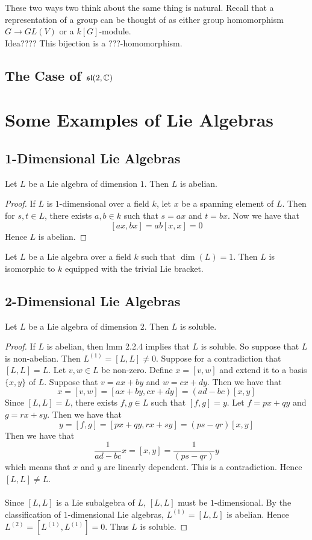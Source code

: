 \documentclass[a4paper]{article}
\begin{document}
These two ways two think about the same thing is natural. Recall that a representation of a group can be thought of as either group homomorphism $G\to GL(V)$ or a $k[G]$-module. \\

Idea???? This bijection is a ???-homomorphism. 

\subsection{The Case of $\mathfrak{sl}(2,\mathbb{C})$}

\pagebreak
\section{Some Examples of Lie Algebras}
\subsection{1-Dimensional Lie Algebras}
\begin{prp}{}{} Let $L$ be a Lie algebra of dimension $1$. Then $L$ is abelian. \tcbline
\begin{proof}
If $L$ is $1$-dimensional over a field $k$, let $x$ be a spanning element of $L$. Then for $s,t\in L$, there exists $a,b\in k$ such that $s=ax$ and $t=bx$. Now we have that $$[ax,bx]=ab[x,x]=0$$ Hence $L$ is abelian. 
\end{proof}
\end{prp}

\begin{prp}{}{} Let $L$ be a Lie algebra over a field $k$ such that $\dim(L)=1$. Then $L$ is isomorphic to $k$ equipped with the trivial Lie bracket. 
\end{prp}

\subsection{2-Dimensional Lie Algebras}
\begin{prp}{}{} Let $L$ be a Lie algebra of dimension $2$. Then $L$ is soluble. \tcbline
\begin{proof}
If $L$ is abelian, then lmm 2.2.4 implies that $L$ is soluble. So suppose that $L$ is non-abelian. Then $L^{(1)}=[L,L]\neq 0$. Suppose for a contradiction that $[L,L]=L$. Let $v,w\in L$ be non-zero. Define $x=[v,w]$ and extend it to a basis $\{x,y\}$ of $L$. Suppose that $v=ax+by$ and $w=cx+dy$. Then we have that $$x=[v,w]=[ax+by,cx+dy]=(ad-bc)[x,y]$$ Since $[L,L]=L$, there exists $f,g\in L$ such that $[f,g]=y$. Let $f=px+qy$ and $g=rx+sy$. Then we have that $$y=[f,g]=[px+qy,rx+sy]=(ps-qr)[x,y]$$ Then we have that $$\frac{1}{ad-bc}x=[x,y]=\frac{1}{(ps-qr)}y$$ which means that $x$ and $y$ are linearly dependent. This is a contradiction. Hence $[L,L]\neq L$. \\~\\

Since $[L,L]$ is a Lie subalgebra of $L$, $[L,L]$ must be $1$-dimensional. By the classification of $1$-dimensional Lie algebras, $L^{(1)}=[L,L]$ is abelian. Hence $L^{(2)}=[L^{(1)},L^{(1)}]=0$. Thus $L$ is soluble. 
\end{proof}
\end{prp}
\end{document}
